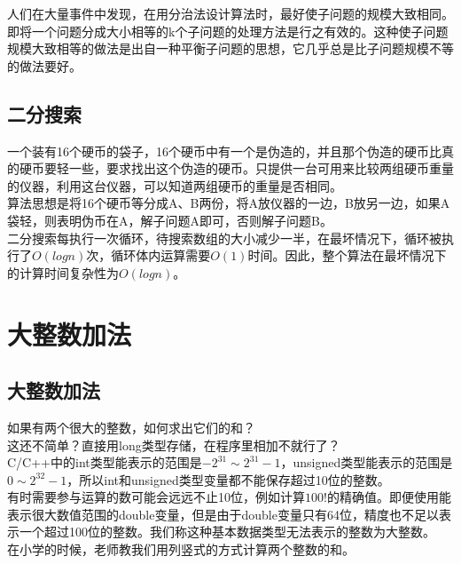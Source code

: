人们在大量事件中发现，在用分治法设计算法时，最好使子问题的规模大致相同。即将一个问题分成大小相等的k个子问题的处理方法是行之有效的。这种使子问题规模大致相等的做法是出自一种平衡子问题的思想，它几乎总是比子问题规模不等的做法要好。\\

\subsection{二分搜索}

一个装有16个硬币的袋子，16个硬币中有一个是伪造的，并且那个伪造的硬币比真的硬币要轻一些，要求找出这个伪造的硬币。只提供一台可用来比较两组硬币重量的仪器，利用这台仪器，可以知道两组硬币的重量是否相同。\\

算法思想是将16个硬币等分成A、B两份，将A放仪器的一边，B放另一边，如果A袋轻，则表明伪币在A，解子问题A即可，否则解子问题B。\\

二分搜索每执行一次循环，待搜索数组的大小减少一半，在最坏情况下，循环被执行了$ O(logn) $次，循环体内运算需要$ O(1) $时间。因此，整个算法在最坏情况下的计算时间复杂性为$ O(logn) $。

\newpage

\section{大整数加法}

\subsection{大整数加法}

如果有两个很大的整数，如何求出它们的和？\\

这还不简单？直接用long类型存储，在程序里相加不就行了？\\

C/C++中的int类型能表示的范围是$ -2^{31} \sim 2^{31} - 1 $，unsigned类型能表示的范围是$ 0 \sim 2^{32} - 1 $，所以int和unsigned类型变量都不能保存超过10位的整数。\\

有时需要参与运算的数可能会远远不止10位，例如计算$ 100! $的精确值。即便使用能表示很大数值范围的double变量，但是由于double变量只有64位，精度也不足以表示一个超过100位的整数。我们称这种基本数据类型无法表示的整数为大整数。\\

在小学的时候，老师教我们用列竖式的方式计算两个整数的和。


